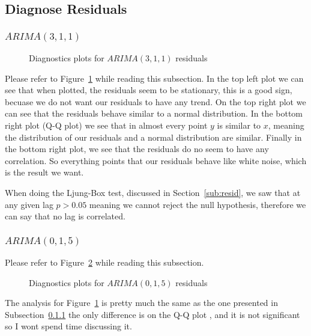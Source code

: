 \documentclass[journal]{IEEEtran}
\begin{document}
\subsection{Diagnose Residuals}

\subsubsection{$ARIMA(3,1,1)$}\label{sub:31}

\begin{figure}[htbp]
  \centering
  
    \caption{Diagnostics plots for $ARIMA(3,1,1)$ residuals}
    \label{fig:diag-31}
\end{figure}

Please refer to Figure~\ref{fig:diag-31} while reading this subsection. In the
top left plot we can see that when plotted, the residuals seem to be
stationary, this is a good sign, becuase we do not want our residuals to have
any trend. On the top right plot we can see that the residuals behave similar
to a normal distribution. In the bottom right plot (Q-Q plot) we see that in
almost every point $y$ is similar to $x$, meaning the distribution of our
residuals and a normal distribution are similar. Finally in the bottom right
plot, we see that the residuals do no seem to have any correlation. So
everything points that our residuals behave like white noise, which is the
result we want.

When doing the Ljung-Box test, discussed in Section~\ref{sub:resid}, we saw
that at any given lag $p > 0.05$ meaning we cannot reject the null hypothesis,
therefore we can say that no lag is correlated.

\subsubsection{$ARIMA(0,1,5)$}

Please refer to Figure~\ref{fig:diag-05} while reading this subsection.
\begin{figure}[htbp]
  \centering
  
    \caption{Diagnostics plots for $ARIMA(0,1,5)$ residuals}
    \label{fig:diag-05}
\end{figure}

The analysis for Figure~\ref{fig:diag-31} is pretty much the same as the one
presented in Subsection~\ref{sub:31} the only difference is on the Q-Q plot ,
and it is not significant so I wont spend time discussing it.
\end{document}
